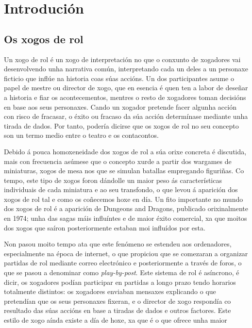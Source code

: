 \chapter{Introdución}

\section{Os xogos de rol}
Un xogo de rol é un xogo de interpretación no que o conxunto de xogadores vai
desenvolvendo unha narrativa común, interpretando cada un deles a un personaxe
ficticio que inflúe na historia coas súas accións. Un dos participantes asume o
papel de mestre ou director de xogo, que en esencia é  quen ten a
labor de deseñar a historia e fiar os acontecementos, mentres o resto de xogadores
toman decisións en base aos seus personaxes. Cando un xogador pretende facer
algunha acción con risco de fracasar, o éxito ou fracaso da súa acción
determínase mediante unha tirada de dados. Por tanto, podería dicirse que os
xogos de rol no seu concepto son un termo medio entre o teatro e os contacontos.
\par
Debido á pouca homoxeneidade dos xogos de rol a súa orixe concreta é
discutida, mais con frecuencia asúmese que o concepto xurde a partir dos
wargames de miniaturas, xogos de mesa nos que se simulan batallas
empregando figuriñas\cite{gamingasculture}. Co tempo, este tipo de xogos foron
dándolle un maior peso ás características individuais de cada miniatura e ao seu
transfondo, o que levou á aparición dos xogos de rol tal e como os coñecemos
hoxe en día. Un fito importante no mundo dos xogos de rol é a aparición de
Dungeons and Dragons, publicado orixinalmente en 1974; unha das sagas máis
influíntes e de maior éxito comercial, xa que moitos dos xogos que saíron
posteriormente estaban moi influídos por esta.
\par
Non pasou moito tempo ata que este fenómeno se estendeu aos ordenadores,
especialmente na época de internet, o que propiciou que se comezaran a organizar
partidas de rol mediante correo electrónico e posteriormente a través de foros,
o que se pasou a denominar como \textit{play-by-post}. Este sistema de rol é
asíncrono, é dicir, os xogadores podían participar en partidas a longo prazo
tendo horarios totalmente distintos: os xogadores enviaban mensaxes explicando o
que pretendían que os seus personaxes fixeran, e o director de xogo respondía co
resultado das súas accións en base a tiradas de dados e outros factores. Este
estilo de xogo aínda existe a día de hoxe, xa que é o que ofrece unha maior
